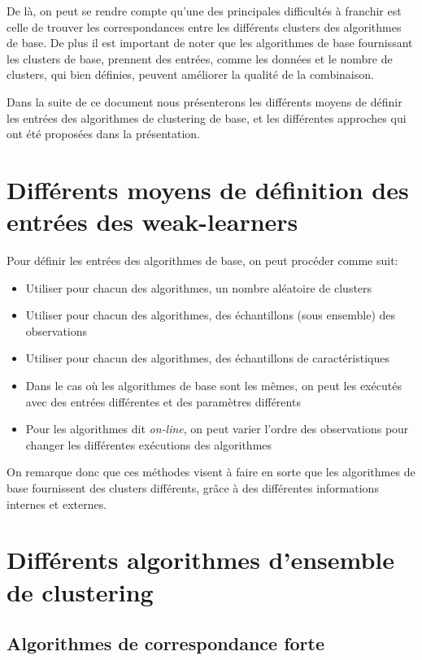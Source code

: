 \documentclass[12pt, french, latin.medieval, a4paper]{report}
\begin{document}
    De là, on peut se rendre compte qu'une des principales difficultés à franchir est celle de trouver les correspondances
    entre les différents clusters des algorithmes de base.
    De plus il est important de noter que les algorithmes de base fournissant les clusters de base, 
    prennent des entrées, comme les données et le nombre de clusters, qui bien définies, peuvent améliorer la qualité de la combinaison.

    Dans la suite de ce document nous présenterons les différents moyens de définir les entrées des algorithmes de clustering de base, 
    et les différentes approches qui ont été proposées dans la présentation.

    \section{Différents moyens de définition des entrées des weak-learners}
    Pour définir les entrées des algorithmes de base, on peut procéder comme suit:
    \begin{itemize}
        \item Utiliser pour chacun des algorithmes, un nombre aléatoire de clusters  
        \item Utiliser pour chacun des algorithmes, des échantillons (sous ensemble) des observations 
        \item Utiliser pour chacun des algorithmes, des échantillons de caractéristiques
        \item Dans le cas où les algorithmes de base sont les mêmes, on peut les exécutés avec des entrées différentes et des paramètres différents
        \item Pour les algorithmes dit \textit{on-line}, on peut varier l'ordre des observations pour changer les différentes exécutions des algorithmes
    \end{itemize}
    
    On remarque donc que ces méthodes visent à faire en sorte que les algorithmes de base fournissent des clusters différents, grâce à des différentes informations internes et externes.

    \section{Différents algorithmes d'ensemble de clustering}
    
    \subsection{Algorithmes de correspondance forte}
    
\end{document}
